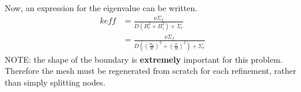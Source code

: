   Now, an expression for the eigenvalue can be written.
  \begin{align}
    keff &= \frac{\nu \Sigma_f}{D(B_r^2 + B_z^2) + \Sigma_r} \\
    &= \frac{\nu \Sigma_f}{D\left(\left(\frac{\alpha_0}{R}\right)^2 + 
      \left(\frac{\pi}{H}\right)^2 \right) + \Sigma_r}
  \end{align}
  NOTE: the shape of the boundary is \textbf{extremely} important for this 
  problem. Therefore
  the mesh must be regenerated from scratch for each 
  refinement, rather than simply splitting nodes.
  
